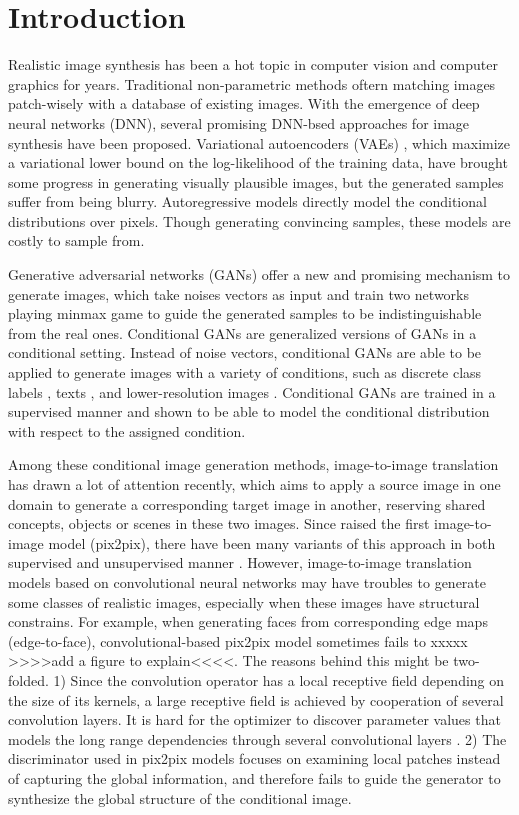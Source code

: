 \section{Introduction}
Realistic image synthesis has been a hot topic in computer vision and computer graphics for years. Traditional non-parametric methods \cite{see DCGAN paper} oftern matching images patch-wisely with a database of existing images. With the emergence of deep neural networks (DNN), several promising DNN-bsed approaches for image synthesis have been proposed. Variational autoencoders (VAEs) \cite{VAEs}, which maximize a variational lower bound on the log-likelihood of the training data, have brought some progress in generating visually plausible images, but the generated samples suffer from being blurry. Autoregressive models \cite{PixCNN} directly model the conditional distributions over pixels. Though generating convincing samples, these models are costly to sample from.
%

Generative adversarial networks (GANs) \cite{GANs} offer a new and promising mechanism to generate images, which take noises vectors as input and train two networks playing minmax game to guide the generated samples to be indistinguishable from the real ones. 
Conditional GANs are generalized versions of GANs in a conditional setting. Instead of noise vectors, conditional GANs are able to be applied to generate images with a variety of conditions, such as discrete class labels \cite{cGANs}, texts \cite{StackGANs, StackGANs++}, and lower-resolution images \cite{SRGANs, more SR}. Conditional GANs are trained in a supervised manner and shown to be able to model the conditional distribution with respect to the assigned condition.
%

%
Among these conditional image generation methods, image-to-image translation has drawn a lot of attention recently, which aims to apply a source image in one domain to generate a corresponding target image in another, reserving shared concepts, objects or scenes in these two images. Since \cite{pix2pix}  raised the first image-to-image model (pix2pix), there have been many variants of this approach in both supervised and unsupervised manner \cite{CycleGANs, DualGANs,CoupleGANs,BicycleGANs}. However, image-to-image translation models based on convolutional neural networks may have troubles to generate some classes of realistic images, especially when these images have structural constrains. For example, when generating faces from corresponding edge maps (edge-to-face), convolutional-based pix2pix model sometimes fails to xxxxx >>>>add a figure to explain<<<<. The reasons behind this might be two-folded. 1)
Since the convolution operator has a local receptive field depending on the size of its kernels, a large receptive field is achieved by cooperation of several convolution layers. It is hard for the optimizer to discover parameter values that models the long range dependencies through several convolutional layers \cite{SAGANs}. 2) The discriminator used in pix2pix models \cite{PatchGANs} focuses on examining local patches instead of capturing the global information, and therefore fails to guide the generator to synthesize the global structure of the conditional image. 

